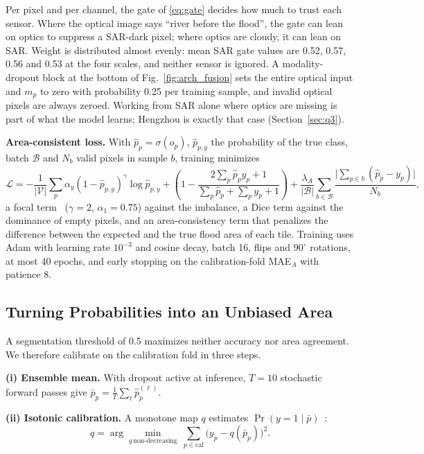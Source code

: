 Per pixel and per channel, the gate of \eqref{eq:gate} decides how much to trust each sensor. Where the optical image says ``river before the flood'', the gate can lean on optics to suppress a SAR-dark pixel; where optics are cloudy, it can lean on SAR. Weight is distributed almost evenly: mean SAR gate values are 0.52, 0.57, 0.56 and 0.53 at the four scales, and neither sensor is ignored. A modality-dropout block at the bottom of Fig.~\ref{fig:arch_fusion} sets the entire optical input and $m_p$ to zero with probability 0.25 per training sample, and invalid optical pixels are always zeroed. Working from SAR alone where optics are missing is part of what the model learns; Hengzhou is exactly that case (Section~\ref{sec:q3}).

\textbf{Area-consistent loss.} With $\hat p_p=\sigma(o_p)$, $\hat p_{p,y}$ the probability of the true class, batch $\mathcal B$ and $N_b$ valid pixels in sample $b$, training minimizes
\begin{equation}
\mathcal L=-\frac{1}{|\mathcal V|}\sum_p\alpha_y(1-\hat p_{p,y})^{\gamma}\log\hat p_{p,y}
+\left(1-\frac{2\sum_p\hat p_py_p+1}{\sum_p\hat p_p+\sum_py_p+1}\right)
+\frac{\lambda_A}{|\mathcal B|}\sum_{b\in\mathcal B}\frac{\big|\sum_{p\in b}(\hat p_p-y_p)\big|}{N_b},
\label{eq:loss}
\end{equation}
a focal term~\cite{lin2017focal} ($\gamma=2$, $\alpha_1=0.75$) against the imbalance, a Dice term against the dominance of empty pixels, and an area-consistency term that penalizes the difference between the expected and the true flood area of each tile. Training uses Adam with learning rate $10^{-3}$ and cosine decay, batch 16, flips and $90^\circ$ rotations, at most 40 epochs, and early stopping on the calibration-fold MAE$_A$ with patience 8.

\subsection{Turning Probabilities into an Unbiased Area}

A segmentation threshold of 0.5 maximizes neither accuracy nor area agreement. We therefore calibrate on the calibration fold in three steps.

\textbf{(i) Ensemble mean.} With dropout active at inference, $T=10$ stochastic forward passes give $\bar p_p=\frac1T\sum_{\ell}\hat p_p^{(\ell)}$.

\textbf{(ii) Isotonic calibration.} A monotone map $q$ estimates $\Pr(y=1\mid\bar p)$~\cite{zadrozny2002calibration}:
\begin{equation}
q=\arg\min_{q\ \text{non-decreasing}}\ \sum_{p\in\mathrm{cal}}\big(y_p-q(\bar p_p)\big)^2 .
\label{eq:isotonic}
\end{equation}

